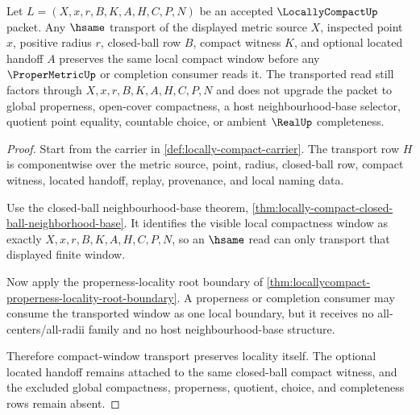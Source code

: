 \begin{theorem}
\label{thm:locallycompact-compact-window-transport}
Let $L=(X,x,r,B,K,A,H,C,P,N)$ be an accepted $\LocallyCompactUp$ packet. Any $\hsame$ transport of the displayed metric source $X$, inspected point $x$, positive radius $r$, closed-ball row $B$, compact witness $K$, and optional located handoff $A$ preserves the same local compact window before any $\ProperMetricUp$ or completion consumer reads it. The transported read still factors through $X,x,r,B,K,A,H,C,P,N$ and does not upgrade the packet to global properness, open-cover compactness, a host neighbourhood-base selector, quotient point equality, countable choice, or ambient $\RealUp$ completeness.
\end{theorem}
\begin{proof}
Start from the carrier in \autoref{def:locally-compact-carrier}. The transport row $H$ is componentwise over the metric source, point, radius, closed-ball row, compact witness, located handoff, replay, provenance, and local naming data.

Use the closed-ball neighbourhood-base theorem, \autoref{thm:locally-compact-closed-ball-neighborhood-base}. It identifies the visible local compactness window as exactly $X,x,r,B,K,A,H,C,P,N$, so an $\hsame$ read can only transport that displayed finite window.

Now apply the properness-locality root boundary of \autoref{thm:locallycompact-properness-locality-root-boundary}. A properness or completion consumer may consume the transported window as one local boundary, but it receives no all-centers/all-radii family and no host neighbourhood-base structure.

Therefore compact-window transport preserves locality itself. The optional located handoff remains attached to the same closed-ball compact witness, and the excluded global compactness, properness, quotient, choice, and completeness rows remain absent.
\end{proof}

